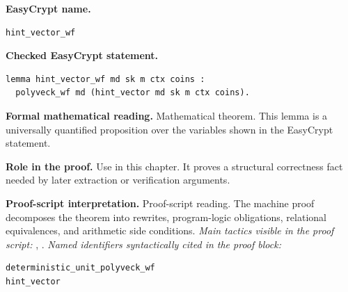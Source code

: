 \begin{formaltheorem}
\noindent\textbf{EasyCrypt name.}
\begin{lstlisting}[language=EasyCrypt,basicstyle=\ttfamily\scriptsize]
hint_vector_wf
\end{lstlisting}
\noindent\textbf{Checked EasyCrypt statement.}
\begin{lstlisting}[language=EasyCrypt,basicstyle=\ttfamily\scriptsize]
lemma hint_vector_wf md sk m ctx coins :
  polyveck_wf md (hint_vector md sk m ctx coins).
\end{lstlisting}
\noindent\textbf{Formal mathematical reading.}
Mathematical theorem. This lemma is a universally quantified proposition over the variables shown in the EasyCrypt statement.

\noindent\textbf{Role in the proof.}
Use in this chapter. It proves a structural correctness fact needed by later extraction or verification arguments.

\noindent\textbf{Proof-script interpretation.}
Proof-script reading. The machine proof decomposes the theorem into rewrites, program-logic obligations, relational equivalences, and arithmetic side conditions.
\emph{Main tactics visible in the proof script:} , .
\emph{Named identifiers syntactically cited in the proof block:}
\begin{lstlisting}[language=EasyCrypt,basicstyle=\ttfamily\scriptsize]
deterministic_unit_polyveck_wf
hint_vector
\end{lstlisting}

\end{formaltheorem}

